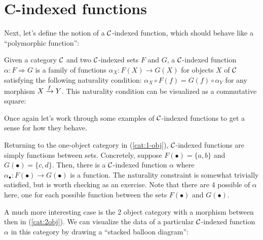 \section{C-indexed functions}
Next, let's define the notion of a $\mathcal C$-indexed function, which 
should behave like a ``polymorphic function'':

\begin{definition}
  \sloppy
  Given a category $\mathcal C$ and two $\mathcal C$-indexed sets $F$ and $G$, 
  a $\mathcal C$-indexed function $\alpha : F \Rightarrow G$ 
  is a family of functions $\alpha_X : F(X) \to G(X)$ for objects $X$ 
  of $\mathcal C$ satisfying the following naturality condition:
  $\alpha_X \circ F(f) = G(f) \circ \alpha_Y$
  for any morphism $X \xrightarrow{f} Y$.
  This naturality condition can be visualized as a commutative square:
  \begin{center}
  \end{center}
\end{definition}

Once again let's work through some examples of $\mathcal C$-indexed functions
to get a sense for how they behave.

Returning to the one-object category in (\ref{cat:1-obj}), $\mathcal C$-indexed functions are simply
functions between sets. Concretely, suppose $F(\bullet) = \{a, b\}$ and
$G(\bullet) = \{c, d\}$. Then, there is a $\mathcal C$-indexed function $\alpha$ 
where $\alpha_\bullet : F(\bullet) \to G(\bullet)$ is a function. The naturality
constraint is somewhat trivially satisfied, but is worth checking as an
exercise. Note that there are 4 possible of $\alpha$ here, one for each possible 
function between the sets $F(\bullet)$ and $G(\bullet)$.

A much more interesting case is the 2 object category with a morphism between 
then in (\ref{cat:2obj}). We can visualize the data 
of a particular $\mathcal C$-indexed function $\alpha$ in this category 
by drawing a ``stacked balloon diagram'':

